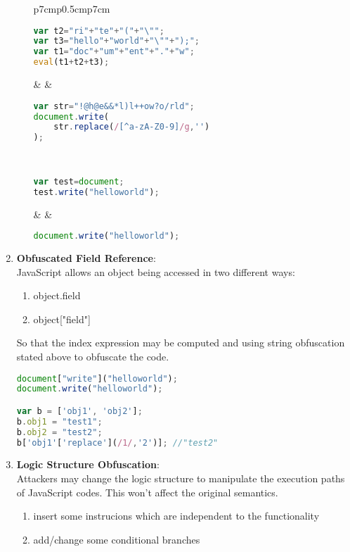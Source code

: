 \documentclass[11pt]{article}
\begin{document}
\begin{enumerate}
\begin{enumerate}
\begin{enumerate}
 		\end{enumerate}
	\begin{tabular}{p{7cm}p{0.5cm}p{7cm}}
			\begin{lstlisting}[language=JavaScript, title=(concatenation)]
var t2="ri"+"te"+"("+"\"";
var t3="hello"+"world"+"\""+");";
var t1="doc"+"um"+"ent"+"."+"w";
eval(t1+t2+t3);
			\end{lstlisting} & & \begin{lstlisting}[language=JavaScript, title=(character substitution)]
var str="!@h@e&&*l)l++ow?o/rld";
document.write(
    str.replace(/[^a-zA-Z0-9]/g,'')
);
			\end{lstlisting} \\ 
			\begin{lstlisting}[language=JavaScript, title=(keyword substitution)]
var test=document;
test.write("helloworld");
			\end{lstlisting}  & & \begin{lstlisting}[language=JavaScript, title=(original code)]
document.write("helloworld");
			\end{lstlisting} 
	\end{tabular}  	 		
 	\end{enumerate}
	\item \textbf{Obfuscated Field Reference}: \\
			JavaScript allows an object being accessed in two different ways: 
			\begin{enumerate}
				\item object.field
				\item object["field"]
			\end{enumerate}
			 So that the index expression may be computed and using string obfuscation stated above to obfuscate the code. \\
			\begin{lstlisting}[language=JavaScript, title=(obfuscated field reference example)]
document["write"]("helloworld");
document.write("helloworld");

var b = ['obj1', 'obj2'];
b.obj1 = "test1";
b.obj2 = "test2";
b['obj1'['replace'](/1/,'2')]; //"test2"
			\end{lstlisting}
	\newpage
	\item \textbf{Logic Structure Obfuscation}\cite{PowerOfObfuscationTechniquesInMaliciousJavaScriptCode}:\\
	Attackers may change the logic structure to manipulate the execution paths of JavaScript codes. This won't affect the original semantics. 
	\begin{enumerate}
			\item insert some instrucions which are independent to the functionality
			\item add/change some conditional branches
	\end{enumerate}
	

\end{enumerate}
\end{document}
